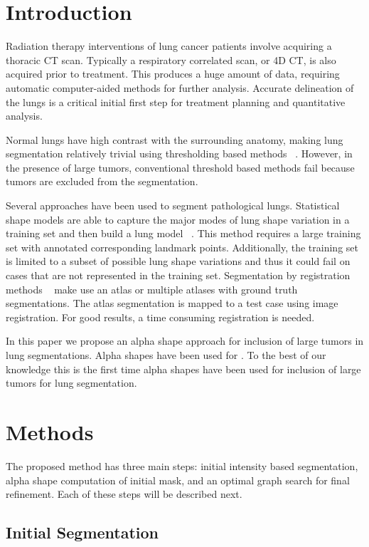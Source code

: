\documentclass{llncs}
\begin{document}
\section{Introduction}
%
Radiation therapy interventions of lung cancer patients involve acquiring a thoracic CT scan. Typically a respiratory correlated scan, or 4D CT, is also acquired prior to treatment. This produces a huge amount of data, requiring automatic computer-aided methods for further analysis. Accurate delineation of the lungs is a critical initial first step for treatment planning and quantitative analysis.

Normal lungs have high contrast with the surrounding anatomy, making lung segmentation relatively trivial using thresholding based methods ~\cite{guo2008,hu2001}. However, in the presence of large tumors, conventional threshold based methods fail because tumors are excluded from the segmentation. 

Several approaches have been used to segment pathological lungs. Statistical shape models are able to capture the major modes of lung shape variation in a training set and then build a lung model ~\cite{sun2012,sofka2011}. This method requires a large training set with annotated corresponding landmark points. Additionally, the training set is limited to a subset of possible lung shape variations and thus it could fail on cases that are not represented in the training set. Segmentation by registration methods ~\cite{sluimer2005,vanrikxoort2009} make use an atlas or multiple atlases with ground truth segmentations. The atlas segmentation is mapped to a test case using image registration. For good results, a time consuming registration is needed.

In this paper we propose an alpha shape approach for inclusion of large tumors in lung segmentations. Alpha shapes have been used for . To the best of our knowledge this is the first time alpha shapes have been used for inclusion of large tumors for lung segmentation. 


%
\section{Methods}
%
The proposed method has three main steps: initial intensity based segmentation, alpha shape computation of initial mask, and an optimal graph search for final refinement. Each of these steps will be described next.
%
\subsection{Initial Segmentation}
%
\end{document}
